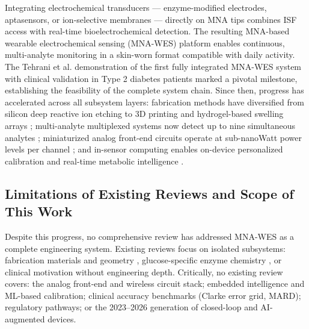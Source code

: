 \documentclass[review,1p]{elsarticle}
\begin{document}
Integrating electrochemical transducers — enzyme-modified electrodes, aptasensors, or ion-selective membranes — directly on MNA tips combines ISF access with real-time bioelectrochemical detection. The resulting MNA-based wearable electrochemical sensing (MNA-WES) platform enables continuous, multi-analyte monitoring in a skin-worn format compatible with daily activity. The Tehrani et al. demonstration of the first fully integrated MNA-WES system with clinical validation in Type 2 diabetes patients \cite{Tehrani2022NatBiomedEng} marked a pivotal milestone, establishing the feasibility of the complete system chain. Since then, progress has accelerated across all subsystem layers: fabrication methods have diversified from silicon deep reactive ion etching to 3D printing and hydrogel-based swelling arrays \cite{Dervisevic2021, Reynoso2024, Zhou2024}; multi-analyte multiplexed systems now detect up to nine simultaneous analytes \cite{Li2025Innovation}; miniaturized analog front-end circuits operate at sub-nanoWatt power levels per channel \cite{Akram2024ISSCC}; and in-sensor computing enables on-device personalized calibration and real-time metabolic intelligence \cite{Fan2026EdgeAI, Liu2025ClosedLoop}.

\subsection{Limitations of Existing Reviews and Scope of This Work}
\label{subsec:existing_reviews}

Despite this progress, no comprehensive review has addressed MNA-WES as a complete engineering system. Existing reviews focus on isolated subsystems: fabrication materials and geometry \cite{Dervisevic2021}, glucose-specific enzyme chemistry \cite{TeymourianReview2021}, or clinical motivation without engineering depth. Critically, no existing review covers: the analog front-end and wireless circuit stack; embedded intelligence and ML-based calibration; clinical accuracy benchmarks (Clarke error grid, MARD); regulatory pathways; or the 2023--2026 generation of closed-loop and AI-augmented devices.
\end{document}
